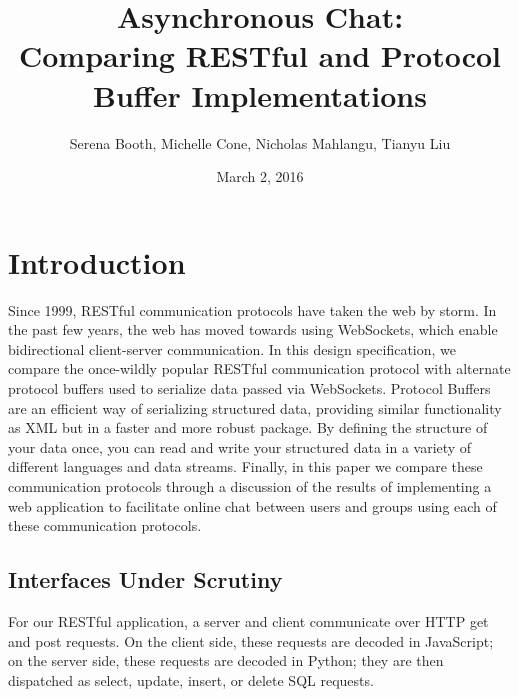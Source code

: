 \documentclass[11pt]{article} %
\title{Asynchronous Chat: \\ Comparing RESTful and Protocol Buffer Implementations}
\author{Serena Booth, Michelle Cone, Nicholas Mahlangu, Tianyu Liu}
\date{March 2, 2016} %
\begin{document}
\maketitle


\section{Introduction}

Since 1999, RESTful communication protocols have taken the web by storm. In the past few years, the web has moved towards using WebSockets, which enable bidirectional client-server communication. In this design specification, we compare the once-wildly popular RESTful communication protocol with alternate protocol buffers used to serialize data passed via WebSockets. Protocol Buffers are an efficient way of serializing structured data, providing similar functionality as XML but in a faster and more robust package. By defining the structure of your data once, you can read and write your structured data in a variety of different languages and data streams.  Finally, in this paper we compare these communication protocols through a discussion of the results of implementing a web application to facilitate online chat between users and groups using each of these communication protocols. 


\subsection{Interfaces Under Scrutiny}

For our RESTful application, a server and client communicate over HTTP get and post requests. On the client side, these requests are decoded in JavaScript; on the server side, these requests are decoded in Python; they are then dispatched as select, update, insert, or delete SQL requests. 
\end{document}
